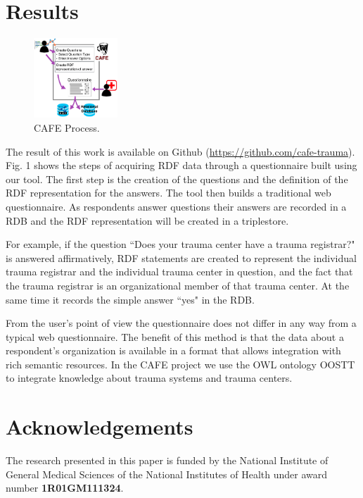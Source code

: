 \documentclass{amia}
\begin{document}
\section*{Results}
\begin{figure}
  \begin{center}
    \includegraphics[width=0.28\textwidth]{pics/cafe_process6.png}
  \end{center}
  \caption{CAFE Process.}
  \label{cafe_process}
\end{figure}

The result of this work is available on Github (\href{https://github.com/cafe-trauma}{https://github.com/cafe-trauma}). Fig. 1 shows the steps of acquiring RDF data through a questionnaire built using our tool. 
The first step is the creation of the questions and the definition of the RDF representation for the answers.
The tool then builds a traditional web questionnaire.
As respondents answer questions their answers are recorded in a RDB and the RDF representation will be created in a triplestore.

For example, if the question ``Does your trauma center have a trauma registrar?" is answered affirmatively, RDF statements are created to represent the individual trauma registrar and the individual trauma center in question, and the fact that the trauma registrar is an organizational member of that trauma center.
At the same time it records the simple answer ``yes" in the RDB.

From the user's point of view the questionnaire does not differ in any way from a typical web questionnaire.
The benefit of this method is that the data about a respondent's organization is available in a format that allows integration with rich semantic resources. 
In the CAFE project we use the OWL ontology OOSTT \cite{ref3} to integrate knowledge about trauma systems and trauma centers. 

\section*{Acknowledgements}
The research presented in this paper is funded by the National Institute of General Medical Sciences of the National Institutes of Health under award number \textbf{1R01GM111324}.
\end{document}
